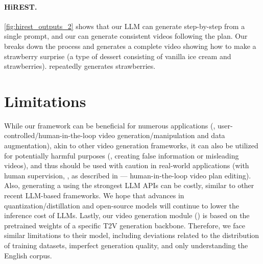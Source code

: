 \paragraph{HiREST.}
\cref{fig:hirest_outputs_2} shows that
our LLM can generate step-by-step \videoplan{} from a single prompt, and our \videomodule{} can generate consistent videos following the plan.
Our \method{} breaks down the process and generates a complete video showing how to make a strawberry surprise (a type of dessert consisting of vanilla ice cream and strawberries). \modelscope{} repeatedly generates strawberries.











\section{Limitations}
\label{sec:limitations}


While our framework can be beneficial for numerous applications (\eg{}, user-controlled/human-in-the-loop video generation/manipulation and data augmentation), akin to other video generation frameworks, it can also be utilized for potentially harmful purposes (\eg{}, creating false information or misleading videos), and thus should be used with caution in real-world applications (with human supervision, \eg{}, as described in  --- human-in-the-loop video plan editing).
Also, generating a \videoplan{} using the strongest LLM APIs can be costly,
similar to other recent LLM-based frameworks.
We hope that advances in quantization/distillation and open-source models will continue to lower the inference cost of LLMs.
Lastly, our video generation module (\videomodule{}) is based on the pretrained weights of a specific T2V generation backbone. Therefore, we face similar limitations to their model, including deviations related to the distribution of training datasets, imperfect generation quality, and only understanding the English corpus.
\vspace{20pt}






